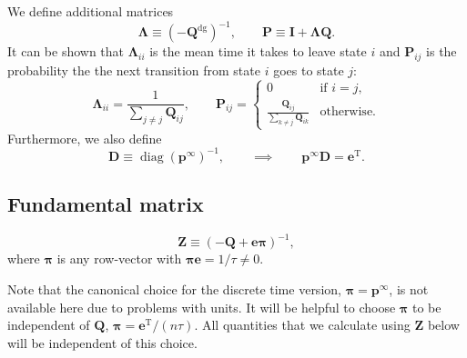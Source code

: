 \documentclass{article} %
\newcommand{\inv}{^{-1}}
\newcommand{\dg}{^\mathrm{dg}}
\newcommand{\trans}{^\mathrm{T}}
\newcommand{\I}{\mathbf{I}}
\newcommand{\onev}{\mathbf{e}}
\newcommand{\MM}{\mathbf{Q}}
\newcommand{\pr}{\mathbf{p}}
\newcommand{\eq}{\pr^\infty}
\newcommand{\fund}{\mathbf{Z}}
\newcommand{\Pb}{\mathbf{P}}
\newcommand{\D}{\mathbf{D}}
\newcommand{\pib}{\boldsymbol{\pi}}
\newcommand{\Lb}{\boldsymbol{\Lambda}}
\begin{document}
We define additional matrices
%
\begin{equation}\label{eq:defDLP}
  \Lb \equiv (-\MM\dg)\inv,
  \qquad
  \Pb \equiv \I + \Lb\MM.
\end{equation}
%
It can be shown that $\Lb_{ii}$ is the mean time it takes to leave state $i$ and $\Pb_{ij}$ is the probability the the next transition from state $i$ goes to state $j$:
%
\begin{equation}\label{eq:LamdaPcmpt}
  \Lb_{ii} = \frac{1}{\sum_{j \neq j} \MM_{ij}},
  \qquad
  \Pb_{ij} = %
  \begin{cases}
     0                                         &\text{if }i=j, \\
     \frac{\MM_{ij}}{\sum_{k \neq j} \MM_{ik}} &\text{otherwise}.
  \end{cases}
\end{equation}
%
Furthermore, we also define
%
\begin{equation}\label{eq:pdotD}
  \D \equiv \operatorname{diag}(\eq)\inv,
  \qquad\implies\qquad
  \eq\D=\onev\trans.
\end{equation}
%

\subsection{Fundamental matrix}\label{sec:fund}

\begin{defn}
  \begin{equation}\label{eq:funddef}
    \fund \equiv (-\MM + \onev\pib)\inv,
  \end{equation}
  where $\pib$ is any row-vector with $\pib\onev=1/\tau\neq0$.
\end{defn}
Note that the canonical choice for the discrete time version, $\pib=\eq$, is not available here due to problems with units.
It will be helpful to choose $\pib$ to be independent of $\MM$, \eg $\pib=\onev\trans/(n\tau)$.
All quantities that we calculate using $\fund$ below will be independent of this choice.
\end{document}
